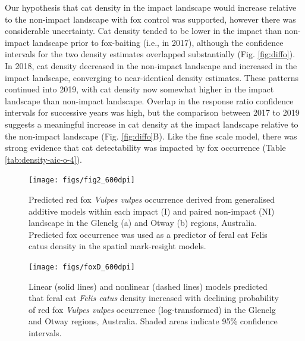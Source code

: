\documentclass[]{elsarticle} %
\begin{document}
Our hypothesis that cat density in the impact landscape would increase relative to the non-impact landscape with fox control was supported, however there was considerable uncertainty. Cat density tended to be lower in the impact than non-impact landscape prior to fox-baiting (i.e., in 2017), although the confidence intervals for the two density estimates overlapped substantially (Fig. \ref{fig:diffo}). In 2018, cat density decreased in the non-impact landscape and increased in the impact landscape, converging to near-identical density estimates. These patterns continued into 2019, with cat density now somewhat higher in the impact landscape than non-impact landscape. Overlap in the response ratio confidence intervals for successive years was high, but the comparison between 2017 to 2019 suggests a meaningful increase in cat density at the impact landscape relative to the non-impact landscape (Fig. \ref{fig:diffo}B). Like the fine scale model, there was strong evidence that cat detectability was impacted by fox occurrence (Table \ref{tab:density-aic-o-4}).

\newpage

\begin{figure}

{\centering \texttt{[image: figs/fig2\_600dpi]} 

}

\caption{Predicted red fox \textit{Vulpes vulpes} occurrence derived from generalised additive models within each impact (I) and paired non-impact (NI) landscape in the Glenelg (a) and Otway (b) regions, Australia. Predicted fox occurrence was used as a predictor of feral cat Felis catus density in the spatial mark-resight models.}\label{fig:foxplot}
\end{figure}

\newpage

\begin{figure}

{\centering \texttt{[image: figs/foxD\_600dpi]} 

}

\caption{Linear (solid lines) and nonlinear (dashed lines) models predicted that feral cat \textit{Felis catus} density increased with declining probability of red fox \textit{Vulpes vulpes} occurrence (log-transformed) in the Glenelg and Otway regions, Australia. Shaded areas indicate 95\% confidence intervals.}\label{fig:dcor}
\end{figure}

\newpage
\end{document}
